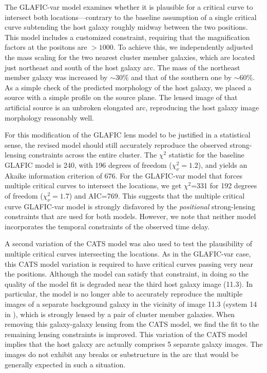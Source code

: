The GLAFIC-var model examines whether it is plausible for a critical
curve to intersect both \spock locations---contrary to the baseline
assumption of a single critical curve subtending the \spock host
galaxy roughly midway between the two positions.  This model includes
a customized constraint, requiring that the magnification factors at
the \spock positons are $>1000$.  To achieve this, we independently
adjusted the mass scaling for the two nearest cluster member galaxies,
which are located just northeast and south of the \spock host galaxy
arc.  The mass of the northeast member galaxy was increased by
$\sim$30\% and that of the southern one by $\sim$60\%.  As a simple
check of the predicted morphology of the host galaxy, we placed a
source with a simple \citet{Sersic:1963} profile on the source
plane. The lensed image of that artificial source is an unbroken
elongated arc, reproducing the host galaxy image morphology reasonably
well.

For this modification of the GLAFIC lens model to be justified in a
statistical sense, the revised model should still accurately reproduce
the observed strong-lensing constraints across the entire cluster.
The $\chi^2$ statistic for the baseline GLAFIC model is 240, with 196
degrees of freedom ($\chi^2_\nu=1.2$), and yields an Akaike
information criterion \citep[AIC][]{Akaike:1974} of 676.  For the
GLAFIC-var model that forces multiple critical curves to intersect the
\spock locations, we get $\chi^2$=331 for 192 degrees of freedom
($\chi^2_\nu=1.7$) and AIC=769.  This suggests that the multiple
critical curve GLAFIC-var model is strongly disfavored by the
{\it positional} strong-lensing constraints that are used for both models.
However, we note that neither model incorporates the temporal
constraints of the observed time delay. 

A second variation of the CATS model was also used to test the
plausibility of multiple critical curves intersecting the \spock
locations.  As in the GLAFIC-var case, this CATS model variation is
required to have critical curves passing very near the \spock
positions.  Although the model can satisfy that constraint, in doing
so the quality of the model fit is degraded near the third \spock host
galaxy image (11.3).  In particular, the model is no longer able to
accurately reproduce the multiple images of a separate background
galaxy in the vicinity of image 11.3 (system 14 in
\citet{Caminha:2017}), which is strongly lensed by a pair of cluster
member galaxies.  When removing this galaxy-galaxy lensing from the
CATS model, we find the fit to the remaining lensing constraints is
improved.  This variation of the CATS model implies that the \spock
host galaxy arc actually comprises 5 separate galaxy images.  The \HST
images do not exhibit any breaks or substructure in the arc that would
be generally expected in such a situation.



